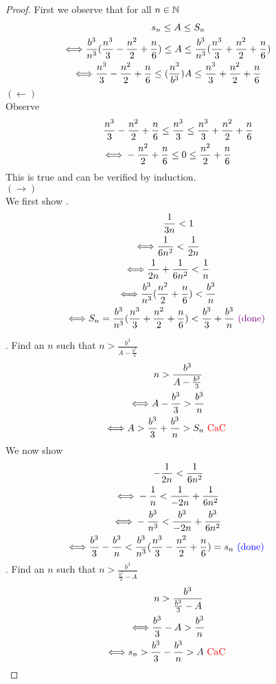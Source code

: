 \documentclass{report}
\begin{document}
\begin{proof}
First we observe that for all $n\in \mathbb{N}$
\begin{gather}
  s_n\leq  A\leq S_n\\
\liff  \frac{b^3}{n^3}(\frac{n^3}{3}-\frac{n^2}{2}+\frac{n}{6})\leq A\leq  \frac{b^3}{n^3}(\frac{n^3}{3}+\frac{n^2}{2}+\frac{n}{6})\\ 
  \llap{$\iff $}\frac{n^3}{3}-\frac{n^2}{2}+\frac{n}{6} \leq (\frac{n^3}{b^3})A\leq  \frac{n^3}{3}+\frac{n^2}{2}+\frac{n}{6}
\end{gather} 
$(\longleftarrow)$\\

Observe
\begin{gather}
  \frac{n^3}{3}-\frac{n^2}{2}+\frac{n}{6} \leq \frac{n^3}{3}\leq \frac{n^3}{3}+\frac{n^2}{2}+\frac{n}{6} \\
  \llap{$\iff$}-\frac{n^2}{2}+\frac{n}{6} \leq 0\leq \frac{n^2}{2}+\frac{n}{6}
\end{gather} 
This is true and can be verified by induction.\\

$(\longrightarrow)$\\

We first show .
\begin{gather}
  \frac{1}{3n} < 1\\
 \liff  \frac{1}{6n^2}< \frac{1}{2n}\\
  \liff \frac{1}{2n}+\frac{1}{6n^2} <\frac{1}{n}\\
 \liff  \frac{b^3}{n^3}(\frac{n^2}{2}+\frac{n}{6})<\frac{b^3}{n} \\ \liff S_n=\frac{b^3}{n^3}(\frac{n^3}{3}+\frac{n^2}{2}+\frac{n}{6}) < \frac{b^3}{3}+\frac{b^3}{n}\text{ \vi{(done)} }
\end{gather} 

. Find an $n$ such that $n>\frac{b^3}{A-\frac{b^3}{3}}$
\begin{gather}
n>\frac{b^3}{A-\frac{b^3}{3}}\\
\liff A-\frac{b^3}{3}>\frac{b^3}{n}\\
\liff A>\frac{b^3}{3}+\frac{b^3}{n}>S_n \text{ \CaC }
\end{gather}
We now show 
\begin{gather}
  -\frac{1}{2n} <\frac{1}{6n^2}\\
\liff   -\frac{1}{n}< \frac{1}{-2n}+\frac{1}{6n^2} \\
 \liff  -\frac{b^3}{n^3} < \frac{b^3}{-2n}+\frac{b^3}{6n^2} \\
\liff   \frac{b^3}{3}-\frac{b^3}{n}< \frac{b^3}{n^3}(\frac{n^3}{3}-\frac{n^2}{2}+\frac{n}{6})=s_n \text{ \blue{(done)} }
\end{gather} 
. Find an $n$ such that $n>\frac{b^3}{\frac{b^3}{3}-A}$
\begin{gather}
n>\frac{b^3}{\frac{b^3}{3}-A}\\
\liff \frac{b^3}{3}-A>\frac{b^3}{n}\\
\liff s_n>\frac{b^3}{3}-\frac{b^3}{n}>A \text{ \CaC }
\end{gather}
\end{proof}
\end{document}
